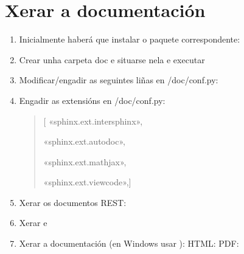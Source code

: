 \documentclass[letterpaper,10pt,spanish]{sphinxmanual}
\begin{document}
\section{Xerar a documentación}
\label{\detokenize{README:xerar-a-documentacion}}\begin{enumerate}
%
\item {} 
\sphinxAtStartPar
Inicialmente haberá que instalar o paquete correspondente:

\item {} 
\sphinxAtStartPar
Crear unha carpeta doc e situarse nela e executar 

\item {} 
\sphinxAtStartPar
Modificar/engadir as seguintes liñas en /doc/conf.py:

\sphinxAtStartPar
{}

\sphinxAtStartPar
{}

\sphinxAtStartPar
{}

\item {} 
\sphinxAtStartPar
Engadir as extensións en /doc/conf.py:
\begin{quote}

\sphinxAtStartPar
{[} «sphinx.ext.intersphinx»,

\sphinxAtStartPar
«sphinx.ext.autodoc»,

\sphinxAtStartPar
«sphinx.ext.mathjax»,

\sphinxAtStartPar
«sphinx.ext.viewcode»,{]}
\end{quote}

\item {} 
\sphinxAtStartPar
Xerar os documentos REST:

\item {} 
\sphinxAtStartPar
Xerar  e 

\item {} 
\sphinxAtStartPar
Xerar a documentación (en Windows usar ):
HTML: 
PDF: 

\end{enumerate}
\end{document}
